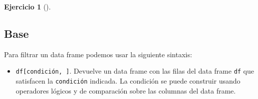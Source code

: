 \documentclass[
  a4paper,
]{scrreport}
\newenvironment{Shaded}{\begin{snugshade}}{\end{snugshade}}
\newcommand{\NormalTok}[1]{\textcolor[rgb]{0.00,0.23,0.31}{#1}}
\newcommand{\SpecialCharTok}[1]{\textcolor[rgb]{0.37,0.37,0.37}{#1}}
\newcommand{\StringTok}[1]{\textcolor[rgb]{0.13,0.47,0.30}{#1}}
\providecommand{\tightlist}{%
  \setlength{\itemsep}{0pt}\setlength{\parskip}{0pt}}\usepackage{longtable,booktabs,array}
\theoremstyle{definition}
\newtheorem{exercise}{Ejercicio}[chapter]
\theoremstyle{remark}
\begin{document}
\begin{exercise}[]
\begin{enumerate}
\begin{tcolorbox}
  \section{Base}

  Para filtrar un data frame podemos usar la siguiente sintaxis:

  \begin{itemize}
  \tightlist
  \item
    \texttt{df{[}condición,\ {]}}. Devuelve un data frame con las filas
    del data frame \texttt{df} que satisfacen la \texttt{condición}
    indicada. La condición se puede construir usando operadores lógicos
    y de comparación sobre las columnas del data frame.
  \end{itemize}

\begin{Shaded}
\end{Shaded}


\end{tcolorbox}
\end{enumerate}
\end{exercise}
\end{document}
